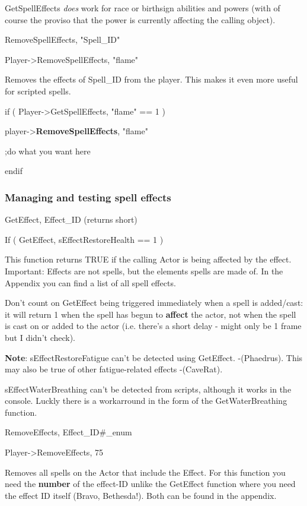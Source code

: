 \documentclass[
]{article}
\begin{document}
GetSpellEffects \emph{does} work for race or birthsign abilities and
powers (with of course the proviso that the power is currently affecting
the calling object).

RemoveSpellEffects, "Spell\_ID"

Player-\textgreater RemoveSpellEffects, "flame"

Removes the effects of Spell\_ID from the player. This makes it even
more useful for scripted spells.

if ( Player-\textgreater GetSpellEffects, "flame" == 1 )

player-\textgreater{}\textbf{RemoveSpellEffects}, "flame"

;do what you want here

endif

\hypertarget{managing-and-testing-spell-effects}{%
\subsubsection{Managing and testing spell
effects}\label{managing-and-testing-spell-effects}}

GetEffect, Effect\_ID (returns short)

If ( GetEffect, sEffectRestoreHealth == 1 )

This function returns TRUE if the calling Actor is being affected by the
effect. Important: Effects are not spells, but the elements spells are
made of. In the Appendix you can find a list of all spell effects.

Don't count on GetEffect being triggered immediately when a spell is
added/cast: it will return 1 when the spell has begun to \textbf{affect}
the actor, not when the spell is cast on or added to the actor (i.e.
there's a short delay - might only be 1 frame but I didn't check).

\textbf{Note}: sEffectRestoreFatigue can't be detected using GetEffect.
-(Phaedrus). This may also be true of other fatigue-related effects
-(CaveRat).

sEffectWaterBreathing can't be detected from scripts, although it works
in the console. Luckly there is a workarround in the form of the
GetWaterBreathing function.

RemoveEffects, Effect\_ID\#\_enum

Player-\textgreater RemoveEffects, 75

Removes all spells on the Actor that include the Effect. For this
function you need the \textbf{number} of the effect-ID unlike the
GetEffect function where you need the effect ID itself (Bravo,
Bethesda!). Both can be found in the appendix.
\end{document}
